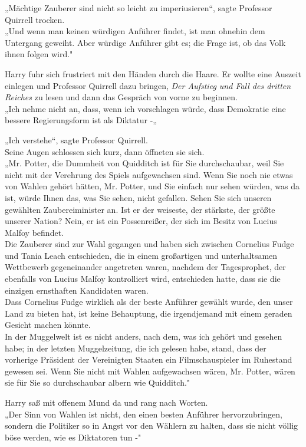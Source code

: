 {„Mächtige Zauberer sind nicht so leicht zu imperiusieren“, sagte Professor Quirrell trocken.\\ „Und wenn man keinen würdigen Anführer findet, ist man ohnehin dem Untergang geweiht. Aber würdige Anführer gibt es; die Frage ist, ob das Volk ihnen folgen wird."

Harry fuhr sich frustriert mit den Händen durch die Haare. Er wollte eine Auszeit einlegen und Professor Quirrell dazu bringen, \emph{Der Aufstieg und Fall des dritten Reiches} zu lesen und dann das Gespräch von vorne zu beginnen.\\ „Ich nehme nicht an, dass, wenn ich vorschlagen würde, dass Demokratie eine bessere Regierungsform ist als Diktatur -„

„Ich verstehe“, sagte Professor Quirrell.\\ Seine Augen schlossen sich kurz, dann öffneten sie sich.\\ „Mr. Potter, die Dummheit von Quidditch ist für Sie durchschaubar, weil Sie nicht mit der Verehrung des Spiels aufgewachsen sind. Wenn Sie noch nie etwas von Wahlen gehört hätten, Mr. Potter, und Sie einfach nur sehen würden, was da ist, würde Ihnen das, was Sie sehen, nicht gefallen. Sehen Sie sich unseren gewählten Zaubereiminister an. Ist er der weiseste, der stärkste, der größte unserer Nation? Nein, er ist ein Possenreißer, der sich im Besitz von Lucius Malfoy befindet.\\ Die Zauberer sind zur Wahl gegangen und haben sich zwischen Cornelius Fudge und Tania Leach entschieden, die in einem großartigen und unterhaltsamen Wettbewerb gegeneinander angetreten waren, nachdem der Tagesprophet, der ebenfalls von Lucius Malfoy kontrolliert wird, entschieden hatte, dass sie die einzigen ernsthaften Kandidaten waren.\\ Dass Cornelius Fudge wirklich als der beste Anführer gewählt wurde, den unser Land zu bieten hat, ist keine Behauptung, die irgendjemand mit einem geraden Gesicht machen könnte.\\ In der Muggelwelt ist es nicht anders, nach dem, was ich gehört und gesehen habe; in der letzten Muggelzeitung, die ich gelesen habe, stand, dass der vorherige Präsident der Vereinigten Staaten ein Filmschauspieler im Ruhestand gewesen sei. Wenn Sie nicht mit Wahlen aufgewachsen wären, Mr. Potter, wären sie für Sie so durchschaubar albern wie Quidditch."

Harry saß mit offenem Mund da und rang nach Worten.\\ „Der Sinn von Wahlen ist nicht, den einen besten Anführer hervorzubringen, sondern die Politiker so in Angst vor den Wählern zu halten, dass sie nicht völlig böse werden, wie es Diktatoren tun -"

}
